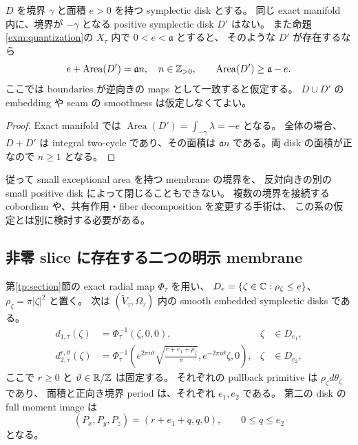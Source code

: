 \begin{corollary}
\label{exm:opposite-disk}
$D$ を境界 $\gamma$ と面積 $e>0$ を持つ symplectic disk とする。
同じ exact manifold 内に、境界が $-\gamma$ となる positive symplectic disk $D'$ はない。
また命題\ref{exm:quantization}の $X_\tau$ 内で $0<e<\mathfrak a$ とすると、
そのような $D'$ が存在するなら
\[
 e+\operatorname{Area}(D')=\mathfrak a n,
 \quad n\in\mathbb Z_{>0},
 \qquad \operatorname{Area}(D')\ge\mathfrak a-e.
\]
ここでは boundaries が逆向きの maps として一致すると仮定する。
$D\cup D'$ の embedding や seam の smoothness は仮定しなくてよい。
\end{corollary}

\begin{proof}
Exact manifold では
$\operatorname{Area}(D')=\int_{-\gamma}\lambda=-e$ となる。
全体の場合、$D+D'$ は integral two-cycle であり、その面積は
$\mathfrak a n$ である。両 disk の面積が正なので $n\ge1$ となる。
\end{proof}

従って small exceptional area を持つ membrane の境界を、
反対向きの別の small positive disk によって閉じることもできない。
複数の境界を接続する cobordism や、共有作用・fiber decomposition を変更する手術は、
この系の仮定とは別に検討する必要がある。

\subsection{非零 slice に存在する二つの明示 membrane}

\begin{proposition}
\label{exm:disks}
第\ref{tp:section}節の exact radial map $\Phi_\tau$ を用い、
$D_e=\{\zeta\in\mathbb C:\rho_\zeta\le e\}$、$\rho_\zeta=\pi|\zeta|^2$ と置く。
次は $(\widetilde V_\tau,\Omega_\tau)$ 内の smooth embedded symplectic disks である。
\begin{align}
 d_{1,\tau}(\zeta)
  &=\Phi_\tau^{-1}(\zeta,0,0),
  &\zeta&\in D_{e_1},\label{exm:first-disk}\\
 d_{2,\tau}^{r,\vartheta}(\zeta)
  &=\Phi_\tau^{-1}\left(
    e^{2\pi i\vartheta}\sqrt{\frac{r+e_1+\rho_\zeta}{\pi}},
    e^{-2\pi i\vartheta}\zeta,0\right),
  &\zeta&\in D_{e_2},\label{exm:second-disk}
\end{align}
ここで $r\ge0$ と $\vartheta\in\mathbb R/\mathbb Z$ は固定する。
それぞれの pullback primitive は $\rho_\zeta d\theta_\zeta$ であり、
面積と正向き境界 period は、それぞれ $e_1,e_2$ である。
第二の disk の full moment image は
\[
 (P_x,P_y,P_z)=(r+e_1+q,q,0),\qquad 0\le q\le e_2
\]
となる。
\end{proposition}

